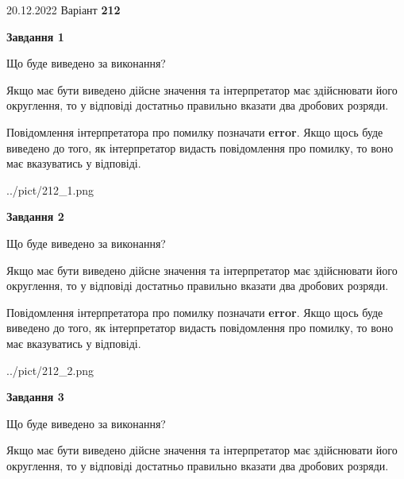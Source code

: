 \documentclass[12pt, ukrainian]{article}
\begin{document}
{20.12.2022 Варіант \No \textbf { 212 }\par}
{
\begin {Large}

{\begin {center}\textbf{Завдання 1}\end {center}}\par
Що буде виведено за виконання? \par

Якщо має бути виведено дійсне значення та інтерпретатор має здійснювати його округлення, 
то у відповіді достатньо правильно вказати два дробових розряди.

Повідомлення інтерпретатора про помилку позначати \textbf{error}.
Якщо щось буде виведено до того, як інтерпретатор видасть повідомлення про помилку, 
то воно має вказуватись у відповіді. \par

\begin{center}
	{../pict/212_1.png}
\end{center}
\newpage

{\begin {center}\textbf{Завдання 2}\end {center}}\par
Що буде виведено за виконання? \par

Якщо має бути виведено дійсне значення та інтерпретатор має здійснювати його округлення, 
то у відповіді достатньо правильно вказати два дробових розряди.

Повідомлення інтерпретатора про помилку позначати \textbf{error}.
Якщо щось буде виведено до того, як інтерпретатор видасть повідомлення про помилку, 
то воно має вказуватись у відповіді. \par

\begin{center}
	{../pict/212_2.png}
\end{center}
\newpage

{\begin {center}\textbf{Завдання 3}\end {center}}\par
Що буде виведено за виконання? \par

Якщо має бути виведено дійсне значення та інтерпретатор має здійснювати його округлення, 
то у відповіді достатньо правильно вказати два дробових розряди.


\end{Large}}
\end{document}

